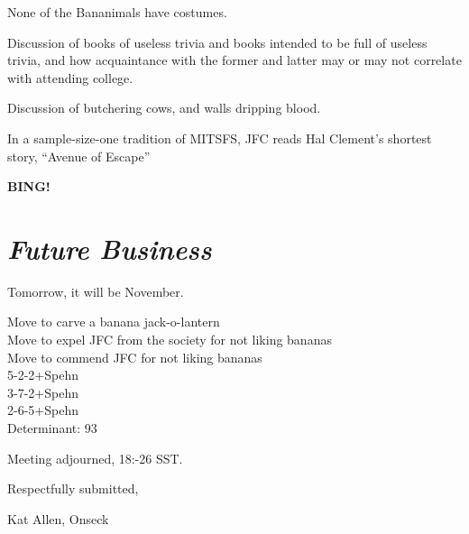 \documentclass[10pt]{article}
\newcommand{\bing}{{\bf BING!} }
\newcommand{\goto}[1]{\bing \vskip 12pt \section*{{\em{#1}}}}
\begin{document}
None of the Bananimals have costumes. 

Discussion of books of useless trivia and books intended to be full of
useless trivia, and how acquaintance with the former and latter may or may not
correlate with attending college.

Discussion of butchering cows, and walls dripping blood.

In a sample-size-one tradition of MITSFS, JFC reads Hal Clement's
shortest story, ``Avenue of Escape''

\goto{Future Business}
Tomorrow, it will be November.


Move to carve a banana jack-o-lantern\\
Move to expel JFC from the society for not liking bananas\\
Move to commend JFC for not liking bananas\\
5-2-2+Spehn\\
3-7-2+Spehn\\
2-6-5+Spehn\\ 
Determinant: 93


\vspace{12pt}

\noindent
Meeting adjourned, 18:-26 SST.

\vspace{18pt}

\centerline{Respectfully submitted,}
\centerline{Kat Allen,  Onseck}
\end{document}
